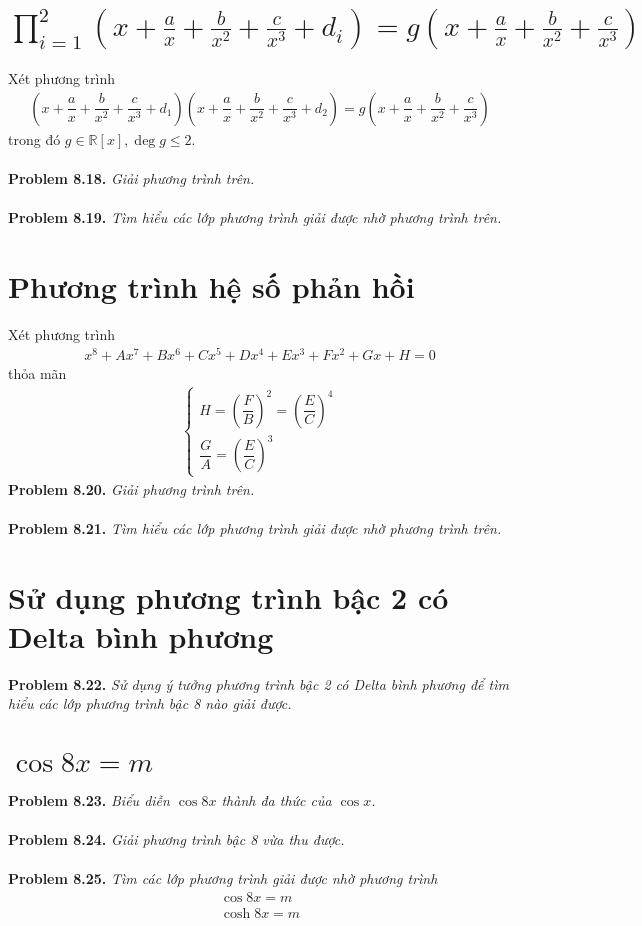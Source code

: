\documentclass[a4paper,oneside]{book}
\numberwithin{equation}{chapter}
\begin{document}
\section{$\prod\limits_{i = 1}^2 {\left( {x + \frac{a}{x} + \frac{b}{{{x^2}}} + \frac{c}{{{x^3}}} + {d_i}} \right)}  = g\left( {x + \frac{a}{x} + \frac{b}{{{x^2}}} + \frac{c}{{{x^3}}}} \right)$}
Xét phương trình
\begin{align}
\left( {x + \dfrac{a}{x} + \dfrac{b}{{{x^2}}} + \dfrac{c}{{{x^3}}} + {d_1}} \right)\left( {x + \dfrac{a}{x} + \dfrac{b}{{{x^2}}} + \dfrac{c}{{{x^3}}} + {d_2}} \right) = g\left( {x + \dfrac{a}{x} + \dfrac{b}{{{x^2}}} + \dfrac{c}{{{x^3}}}} \right)
\end{align}
trong đó $g \in \mathbb{R} \left[ x \right],\deg g \le 2$.\\
\\
\textbf{Problem 8.18.} \textit{Giải phương trình trên.}\\
\\
\textbf{Problem 8.19.} \textit{Tìm hiểu các lớp phương trình giải được nhờ phương trình trên.}
\section{Phương trình hệ số phản hồi}
Xét phương trình 
\begin{align}
{x^8} + A{x^7} + B{x^6} + C{x^5} + D{x^4} + E{x^3} + F{x^2} + Gx + H = 0
\end{align}
thỏa mãn 
\begin{align}
\left\{ {\begin{array}{*{20}{c}}
{H = {{\left( {\dfrac{F}{B}} \right)}^2} = {{\left( {\dfrac{E}{C}} \right)}^4}}\\
{\dfrac{G}{A} = {{\left( {\dfrac{E}{C}} \right)}^3}}
\end{array}} \right.
\end{align}
\textbf{Problem 8.20.} \textit{Giải phương trình trên.}\\
\\
\textbf{Problem 8.21.} \textit{Tìm hiểu các lớp phương trình giải được nhờ phương trình trên.}
\section{Sử dụng phương trình bậc 2 có Delta bình phương}
\textbf{Problem 8.22.} \textit{Sử dụng ý tưởng phương trình bậc 2 có Delta bình phương để tìm hiểu các lớp phương trình bậc 8 nào giải được.}
\section{$\cos 8x = m$}
\textbf{Problem 8.23.} \textit{Biểu diễn $\cos 8x$ thành đa thức của $\cos x$.}\\
\\
\textbf{Problem 8.24.} \textit{Giải phương trình bậc 8 vừa thu được.}\\
\\
\textbf{Problem 8.25.} \textit{Tìm các lớp phương trình giải được nhờ phương trình}
\begin{align}
\cos 8x = m\\
\cosh 8x = m
\end{align}
\end{document}
